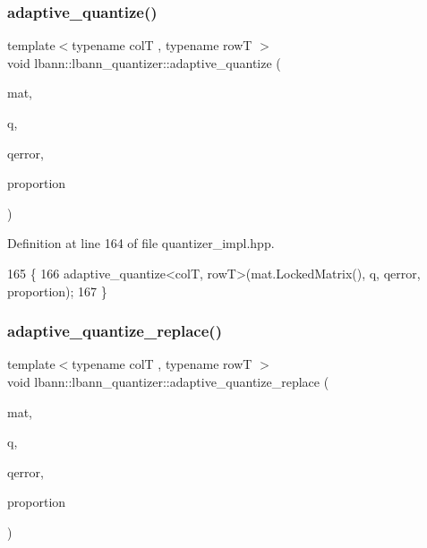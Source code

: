 \subsubsection{\texorpdfstring{adaptive\+\_\+quantize()}{adaptive\_quantize()}\hspace{0.1cm}{\footnotesize\ttfamily [2/2]}}
{\footnotesize\ttfamily template$<$typename colT , typename rowT $>$ \\
void lbann\+::lbann\+\_\+quantizer\+::adaptive\+\_\+quantize (\begin{DoxyParamCaption}\item[{const \hyperlink{base_8hpp_a0fab5387556805cfeac3e7e567bf66c5}{Dist\+Mat} \&}]{mat,  }\item[{std\+::vector$<$ rowT $>$ \&}]{q,  }\item[{\hyperlink{base_8hpp_a68f11fdc31b62516cb310831bbe54d73}{Mat} \&}]{qerror,  }\item[{int}]{proportion }\end{DoxyParamCaption})}



Definition at line 164 of file quantizer\+\_\+impl.\+hpp.


\begin{DoxyCode}
165                                                                        \{
166   adaptive\_quantize<colT, rowT>(mat.LockedMatrix(), q, qerror, proportion);
167 \}
\end{DoxyCode}
\mbox{\label{classlbann_1_1lbann__quantizer_a25ed3869c6bc615ae51198803ea4e33d}} 
\subsubsection{\texorpdfstring{adaptive\+\_\+quantize\+\_\+replace()}{adaptive\_quantize\_replace()}}
{\footnotesize\ttfamily template$<$typename colT , typename rowT $>$ \\
void lbann\+::lbann\+\_\+quantizer\+::adaptive\+\_\+quantize\+\_\+replace (\begin{DoxyParamCaption}\item[{\hyperlink{base_8hpp_a68f11fdc31b62516cb310831bbe54d73}{Mat} \&}]{mat,  }\item[{std\+::vector$<$ rowT $>$ \&}]{q,  }\item[{\hyperlink{base_8hpp_a68f11fdc31b62516cb310831bbe54d73}{Mat} \&}]{qerror,  }\item[{int}]{proportion }\end{DoxyParamCaption})\hspace{0.3cm}{\ttfamily [private]}}

